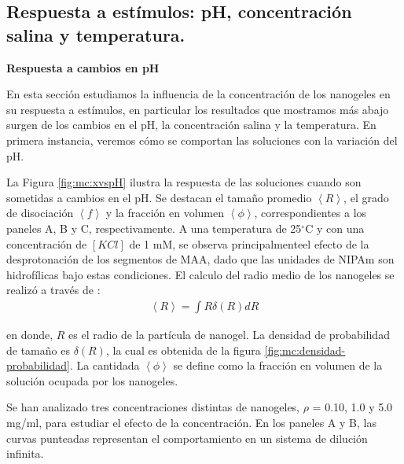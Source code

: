 	
	
	\subsection{Respuesta a est\'imulos: pH, concentraci\'on salina y temperatura.}\label{sec:mc:phs_salt_temp}
	
	\textbf{Respuesta a cambios en pH}
	
	En esta secci\'on estudiamos la influencia de la concentraci\'on de los nanogeles en su respuesta a est\'imulos, en particular los resultados que mostramos m\'as abajo surgen de los cambios en el pH, la concentraci\'on salina y la temperatura. En primera instancia, veremos c\'omo se comportan las soluciones con la variaci\'on del pH. %
	
	La Figura \ref{fig:mc:xvspH} ilustra la respuesta de las soluciones cuando son sometidas a cambios en el pH. Se destacan el tama\~no promedio $\left<R\right>$, el grado de disociaci\'on $\left<f\right>$ y la fracci\'on en volumen $\left<\phi\right>$, correspondientes a los paneles A, B y C, respectivamente. A una temperatura de 25$^\circ$C y con una concentraci\'on de $[KCl]$ de 1 mM, se observa principalmenteel efecto de la desprotonaci\'on de los segmentos de MAA, dado que las unidades de NIPAm son hidrof\'ilicas bajo estas condiciones.
	El calculo  del radio medio de los nanogeles se realiz\'o a trav\'es de :
	\begin{align}
		\left< R\right> = \int R\delta(R)dR
	\end{align} 
	
	\noindent en donde, $R$ es el radio de la part\'icula de nanogel. La densidad de probabilidad de tama\~no es $\delta(R)$, la cual es obtenida de la figura \ref{fig:mc:densidad-probabilidad}. 
	La cantidada $\left<\phi\right>$ se define como la fracci\'on en volumen  de la soluci\'on ocupada por los nanogeles.
	
	 Se han analizado tres concentraciones distintas de nanogeles, $\rho$ = 0.10, 1.0 y 5.0 mg/ml, para estudiar el efecto de la concentraci\'on. En los paneles A y B, las curvas punteadas representan el comportamiento en un sistema de diluci\'on infinita.
	

